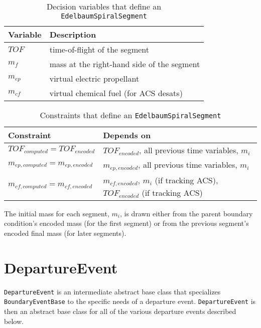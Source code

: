 \begin{table}
	\centering
	\caption{Decision variables that define an \texttt{EdelbaumSpiralSegment}}
	\label{tab:decision_variables_EdelbaumSpiralSegment}
	\begin{tabular}{ll}
		\hline\hline
		Variable & Description\\
		\hline
		$TOF$ & time-of-flight of the segment\\
		$m_f$ &mass at the right-hand side of the segment\\
		$m_{ep}$ & virtual electric propellant\\
		$m_{cf}$ &virtual chemical fuel (for ACS desats)\\
		\hline\hline		
	\end{tabular}
\end{table}

\begin{table}
	\centering
	\caption{Constraints that define an \texttt{EdelbaumSpiralSegment}}
	\label{tab:constraints_EdelbaumSpiralSegment}
	\begin{tabular}{ll}
		\hline\hline
		Constraint & Depends on\\
		\hline		
		$TOF_{computed} = TOF_{encoded}$& $TOF_{encoded}$, all previous time variables, $m_{i}$\\
		$m_{ep,computed} = m_{ep,encoded}$& $m_{ep,encoded}$, all previous time variables, $m_{i}$\\
		
		$m_{cf,computed} = m_{cf,encoded}$& $m_{cf,encoded}$, $m_{i}$ (if tracking ACS), $TOF_{encoded}$ (if tracking ACS)\\
		\hline\hline		
	\end{tabular}
\end{table}

The initial mass for each segment, $m_i$, is drawn either from the parent boundary condition's encoded mass (for the first segment) or from the previous segment's encoded final mass (for later segments).


\section{DepartureEvent}
\label{sec:departureevent}

\texttt{DepartureEvent} is an intermediate abstract base class that specializes \texttt{BoundaryEventBase} to the specific needs of a departure event. \texttt{DepartureEvent} is then an abstract base class for all of the various departure events described below.

